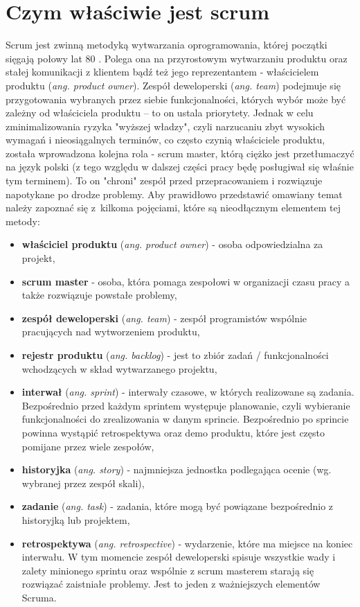 \section{Czym właściwie jest scrum}
Scrum jest zwinną metodyką wytwarzania oprogramowania, której początki sięgają połowy lat 80 \cite{SCRUM}. Polega ona na przyrostowym wytwarzaniu produktu oraz stałej komunikacji z klientem bądź też jego reprezentantem - właścicielem produktu (\textit{ang. product owner}). Zespół deweloperski ({\textit{ang. team}}) podejmuje się przygotowania wybranych przez siebie funkcjonalności, których wybór może być zależny od właściciela produktu -- to on ustala priorytety. Jednak w celu zminimalizowania ryzyka "wyższej władzy", czyli narzucaniu zbyt wysokich wymagań i nieosiągalnych terminów, co często czynią właściciele produktu, została wprowadzona kolejna rola - scrum master, którą ciężko jest przetłumaczyć na język polski (z tego względu w dalszej części pracy będę posługiwał się właśnie tym terminem). To on "chroni" zespół przed przepracowaniem i rozwiązuje napotykane po drodze problemy. Aby prawidłowo przedstawić omawiany temat należy zapoznać się z~kilkoma pojęciami, które są nieodłącznym elementem tej metody:
\begin{itemize}
	\item \textbf{właściciel produktu} (\textit{ang. product owner}) - osoba odpowiedzialna za projekt,
	\item \textbf{scrum master} - osoba, która pomaga zespołowi w organizacji czasu pracy a także rozwiązuje powstałe problemy,
	\item \textbf{zespół deweloperski} (\textit{ang. team}) - zespół programistów wspólnie pracujących nad wytworzeniem produktu,
	\item \textbf{rejestr produktu} (\textit{ang. backlog}) - jest to zbiór zadań / funkcjonalności wchodzących w skład wytwarzanego projektu,
	\item \textbf{interwał} (\textit{ang. sprint}) - interwały czasowe, w których realizowane są zadania. Bezpośrednio przed każdym sprintem występuje planowanie, czyli wybieranie funkcjonalności do zrealizowania w danym sprincie. Bezpośrednio po sprincie powinna wystąpić retrospektywa oraz demo produktu, które jest często pomijane przez wiele zespołów,
	\item \textbf{historyjka} (\textit{ang. story}) - najmniejsza jednostka podlegająca ocenie (wg. wybranej przez zespół skali),
	\item \textbf{zadanie} (\textit{ang. task}) - zadania, które mogą być powiązane bezpośrednio z historyjką lub projektem,
	\item \textbf{retrospektywa} (\textit{ang. retrospective}) - wydarzenie, które ma miejsce na koniec interwału. W tym momencie zespół deweloperski spisuje wszystkie wady i zalety minionego sprintu oraz wspólnie z scrum masterem starają się rozwiązać zaistniałe problemy. Jest to jeden z ważniejszych elementów Scruma.
\end{itemize} 


